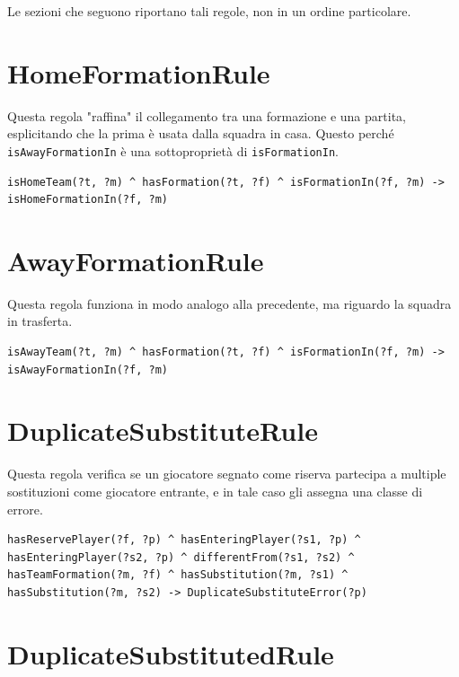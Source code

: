 \documentclass[11pt]{report} %
\begin{document}
Le sezioni che seguono riportano tali regole, non in un ordine particolare.

\section{HomeFormationRule}

Questa regola "raffina" il collegamento tra una formazione e una partita, esplicitando che la prima è usata dalla squadra in casa.
Questo perché \texttt{isAwayFormationIn} è una sottoproprietà di \texttt{isFormationIn}.

\begin{lstlisting}[language=SWRL]
isHomeTeam(?t, ?m) ^ hasFormation(?t, ?f) ^ isFormationIn(?f, ?m) -> isHomeFormationIn(?f, ?m)
\end{lstlisting}

\section{AwayFormationRule}

Questa regola funziona in modo analogo alla precedente, ma riguardo la squadra in trasferta.

\begin{lstlisting}[language=SWRL]
isAwayTeam(?t, ?m) ^ hasFormation(?t, ?f) ^ isFormationIn(?f, ?m) -> isAwayFormationIn(?f, ?m)
\end{lstlisting}

\newpage

\section{DuplicateSubstituteRule}

Questa regola verifica se un giocatore segnato come riserva partecipa a multiple sostituzioni come giocatore entrante, e in tale caso gli assegna una classe di errore.

\begin{lstlisting}[language=SWRL]
hasReservePlayer(?f, ?p) ^ hasEnteringPlayer(?s1, ?p) ^ hasEnteringPlayer(?s2, ?p) ^ differentFrom(?s1, ?s2) ^ hasTeamFormation(?m, ?f) ^ hasSubstitution(?m, ?s1) ^ hasSubstitution(?m, ?s2) -> DuplicateSubstituteError(?p)
\end{lstlisting}

\section{DuplicateSubstitutedRule}
\end{document}
